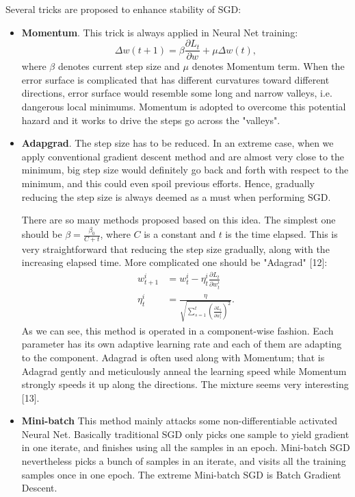 \documentclass{article} %
\begin{document}
Several tricks are proposed to enhance stability of SGD:
\begin{itemize}
   \item {\bf Momentum}. This trick is always applied in Neural Net training:
   $$
   \Delta w(t+1) = \beta \frac{\partial L_t}{\partial w} + \mu \Delta w(t),
   $$
   where $\beta$ denotes current step size and $\mu$ denotes Momentum term. When the error surface is complicated that has different curvatures toward different directions, error surface would resemble some long and narrow valleys, i.e. dangerous local minimums. Momentum is adopted to overcome this potential hazard and it works to drive the steps go across the "valleys".

   \item {\bf Adapgrad}. The step size has to be reduced. 
In an extreme case, when we apply conventional gradient descent method and are almost very close to the minimum, big step size would definitely go back and forth with respect to the minimum, and this could even spoil previous efforts. Hence, gradually reducing the step size is always deemed as a must when performing SGD.

   There are so many methods proposed based on this idea. The simplest one should be $ \beta = \frac{\beta_0}{C+t} $, where $C$ is a constant and $t$ is the time elapsed. This is very straightforward that reducing the step size gradually, along with the increasing elapsed time. More complicated one should be "Adagrad" [12]:
   \begin{align*}
      w_{t+1}^i &= w_{t}^i - \eta^i_t \frac{\partial L_{t}}{\partial w^i_t} \\
      \eta^i_t &= \frac{\eta}{\sqrt{\sum_{s=1}^t (\frac{\partial L_t}{\partial w^i_t})^2}}.
   \end{align*}
   As we can see, this method is operated in a component-wise fashion. Each parameter has its own adaptive learning rate and each of them are adapting to the component. Adagrad is often used along with Momentum; that is Adagrad gently and meticulously anneal the learning speed while Momentum strongly speeds it up along the directions. The mixture seems very interesting [13].

   \item {\bf Mini-batch} This method mainly attacks some non-differentiable activated Neural Net. Basically traditional SGD only picks one sample to yield gradient in one iterate, and finishes using all the samples in an epoch. Mini-batch SGD nevertheless picks a bunch of samples in an iterate, and visits all the training samples once in one epoch. The extreme Mini-batch SGD is Batch Gradient Descent. 


\end{itemize}
\end{document}

